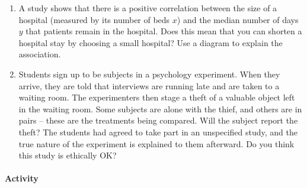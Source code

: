 \documentclass[10pt]{article}
\newcommand{\ans}{\vspace{0.25in}}
\begin{document}
\begin{enumerate}
  \vspace{2in}
  
  \item A study shows that there is a positive correlation between the size of a hospital (measured by its number of beds $x$) and the median number of days $y$ that patients remain in the hospital. Does this mean that you can shorten a hospital stay by choosing a small hospital? Use a diagram to explain the association.
  
  \vspace{2in}
  
  \item Students sign up to be subjects in a psychology experiment. When they arrive, they are told that interviews are running late and are taken to a waiting room. The experimenters then stage a theft of a valuable object left in the waiting room. Some subjects are alone with the thief, and others are in pairs -- these are the treatments being compared. Will the subject report the theft? The students had agreed to take part in an unspecified study, and the true nature of the experiment is explained to them afterward. Do you think this study is ethically OK?
  \ans
\end{enumerate}


\paragraph{Activity}
\end{document}
